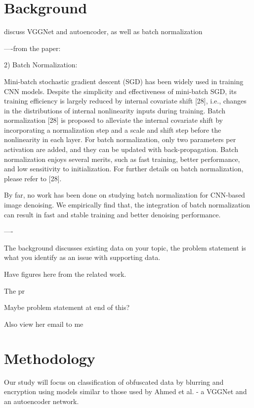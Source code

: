 \documentclass[12pt, titlepage]{article}
\begin{document}
\section{Background}\label{Background}

discuss VGGNet and autoencoder, as well as batch normalization

----from the paper:


2) Batch Normalization:

Mini-batch stochastic gradient descent (SGD) has been widely used in training CNN models. Despite the simplicity and effectiveness of mini-batch SGD, its training efficiency is largely reduced by internal covariate shift [28], i.e., changes in the distributions of internal nonlinearity inputs during training. Batch normalization [28] is proposed to alleviate the internal covariate shift by incorporating a normalization step and a scale and shift step before the nonlinearity in each layer. For batch normalization, only two parameters per activation are added, and they can be updated with back-propagation. Batch normalization enjoys several merits, such as fast training, better performance, and low sensitivity to initialization. For further details on batch normalization, please refer to [28].

By far, no work has been done on studying batch normalization for CNN-based image denoising. We empirically find that, the integration of batch normalization can result in fast and stable training and better denoising performance.

----



The background discusses existing data on your topic, the problem statement is what you identify as an issue with supporting data. 

Have figures here from the related work.

The pr



Maybe problem statement at end of this?

Also view her email to me

\section{Methodology}

Our study will focus on classification of obfuscated data by blurring and encryption using models similar to those used by Ahmed et al. - a VGGNet and an autoencoder network.
\end{document}

